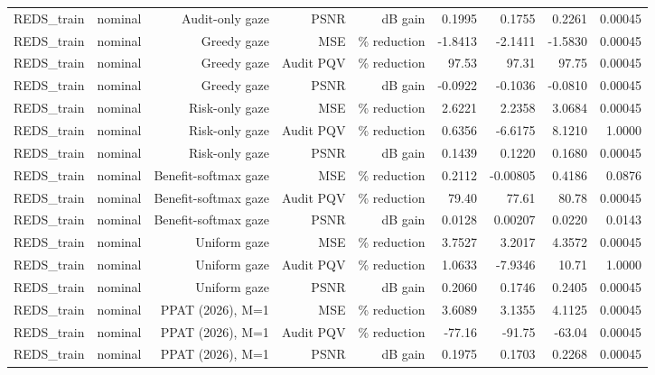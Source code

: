\begin{table}[t]
\begin{tabular}{llrrrrrrr}
REDS\_train & nominal & Audit-only gaze & PSNR & dB gain & 0.1995 & 0.1755 & 0.2261 & 0.00045 \\
REDS\_train & nominal & Greedy gaze & MSE & \% reduction & -1.8413 & -2.1411 & -1.5830 & 0.00045 \\
REDS\_train & nominal & Greedy gaze & Audit PQV & \% reduction & 97.53 & 97.31 & 97.75 & 0.00045 \\
REDS\_train & nominal & Greedy gaze & PSNR & dB gain & -0.0922 & -0.1036 & -0.0810 & 0.00045 \\
REDS\_train & nominal & Risk-only gaze & MSE & \% reduction & 2.6221 & 2.2358 & 3.0684 & 0.00045 \\
REDS\_train & nominal & Risk-only gaze & Audit PQV & \% reduction & 0.6356 & -6.6175 & 8.1210 & 1.0000 \\
REDS\_train & nominal & Risk-only gaze & PSNR & dB gain & 0.1439 & 0.1220 & 0.1680 & 0.00045 \\
REDS\_train & nominal & Benefit-softmax gaze & MSE & \% reduction & 0.2112 & -0.00805 & 0.4186 & 0.0876 \\
REDS\_train & nominal & Benefit-softmax gaze & Audit PQV & \% reduction & 79.40 & 77.61 & 80.78 & 0.00045 \\
REDS\_train & nominal & Benefit-softmax gaze & PSNR & dB gain & 0.0128 & 0.00207 & 0.0220 & 0.0143 \\
REDS\_train & nominal & Uniform gaze & MSE & \% reduction & 3.7527 & 3.2017 & 4.3572 & 0.00045 \\
REDS\_train & nominal & Uniform gaze & Audit PQV & \% reduction & 1.0633 & -7.9346 & 10.71 & 1.0000 \\
REDS\_train & nominal & Uniform gaze & PSNR & dB gain & 0.2060 & 0.1746 & 0.2405 & 0.00045 \\
REDS\_train & nominal & PPAT (2026), M=1 & MSE & \% reduction & 3.6089 & 3.1355 & 4.1125 & 0.00045 \\
REDS\_train & nominal & PPAT (2026), M=1 & Audit PQV & \% reduction & -77.16 & -91.75 & -63.04 & 0.00045 \\
REDS\_train & nominal & PPAT (2026), M=1 & PSNR & dB gain & 0.1975 & 0.1703 & 0.2268 & 0.00045 \\
\bottomrule
\end{tabular}
\end{table}
